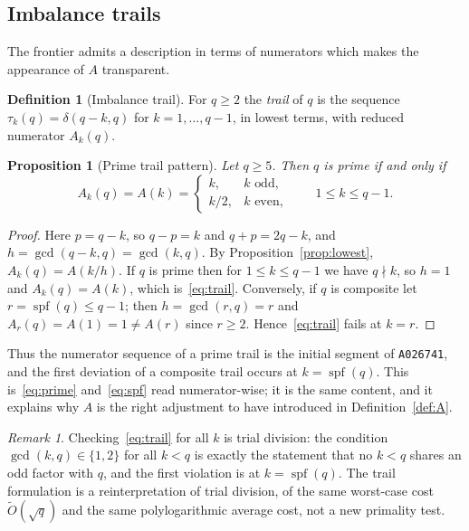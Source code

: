 \documentclass[11pt,a4paper]{article}
\theoremstyle{plain}
\newtheorem{proposition}[theorem]{Proposition}
\theoremstyle{definition}
\newtheorem{definition}[theorem]{Definition}
\theoremstyle{remark}
\newtheorem{remark}[theorem]{Remark}
\DeclareMathOperator{\spf}{spf}
\begin{document}
\subsection{Imbalance trails}

The frontier admits a description in terms of numerators which makes the
appearance of $A$ transparent.

\begin{definition}[Imbalance trail]
For $q \ge 2$ the \emph{trail} of $q$ is the sequence $\tau_k(q) = \delta(q-k,q)$
for $k = 1, \dots, q-1$, in lowest terms, with reduced numerator $A_k(q)$.
\end{definition}

\begin{proposition}[Prime trail pattern]\label{prop:trail}
Let $q \ge 5$. Then $q$ is prime if and only if
\begin{equation}\label{eq:trail}
  A_k(q) = A(k) =
  \begin{cases} k, & k \text{ odd},\\ k/2, & k \text{ even},\end{cases}
  \qquad 1 \le k \le q-1 .
\end{equation}
\end{proposition}

\begin{proof}
Here $p = q - k$, so $q - p = k$ and $q + p = 2q - k$, and
$h = \gcd(q-k, q) = \gcd(k,q)$. By Proposition~\ref{prop:lowest},
$A_k(q) = A(k/h)$. If $q$ is prime then for $1 \le k \le q-1$ we have
$q \nmid k$, so $h = 1$ and $A_k(q) = A(k)$, which is~\eqref{eq:trail}.
Conversely, if $q$ is composite let $r = \spf(q) \le q-1$; then $h = \gcd(r,q) = r$
and $A_r(q) = A(1) = 1 \ne A(r)$ since $r \ge 2$. Hence~\eqref{eq:trail} fails
at $k = r$.
\end{proof}

Thus the numerator sequence of a prime trail is the initial segment of
\texttt{A026741}, and the first deviation of a composite trail occurs at
$k = \spf(q)$. This is~\eqref{eq:prime} and~\eqref{eq:spf} read numerator-wise;
it is the same content, and it explains why $A$ is the right adjustment to have
introduced in Definition~\ref{def:A}.

\begin{remark}
Checking~\eqref{eq:trail} for all $k$ is trial division: the condition
$\gcd(k,q) \in \{1,2\}$ for all $k < q$ is exactly the statement that no
$k < q$ shares an odd factor with $q$, and the first violation is at
$k = \spf(q)$. The trail formulation is a reinterpretation of trial division, of
the same worst-case cost $\widetilde{O}(\sqrt q)$ and the same
polylogarithmic average cost, not a new primality test.
\end{remark}
\end{document}
